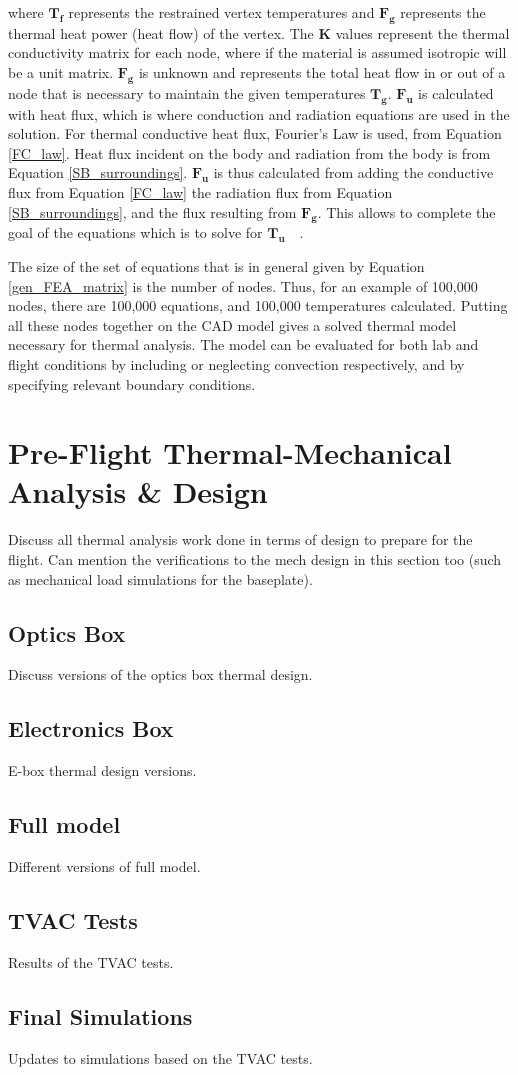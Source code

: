 where $\bm{T_f}$ represents the restrained vertex temperatures and $\bm{F_g}$ represents the thermal heat power (heat flow) of the vertex. The $\bm{K}$ values represent the thermal conductivity matrix for each node, where if the material is assumed isotropic will be a unit matrix. $\bm{F_g}$ is unknown and represents the total heat flow in or out of a node that is necessary to maintain the given temperatures $\bm{T_g}$. $\bm{F_u}$ is calculated with heat flux, which is where conduction and radiation equations are used in the solution. For thermal conductive heat flux, Fourier's Law is used, from Equation \ref{FC_law}. Heat flux incident on the body and radiation from the body is from Equation \ref{SB_surroundings}. $\bm{F_u}$ is thus calculated from adding the conductive flux from Equation \ref{FC_law} the radiation flux from Equation \ref{SB_surroundings}, and the flux resulting from $\bm{F_g}$. This allows to complete the goal of the equations which is to solve for $\bm{T_u}$~\cite{FEA_SW}~\cite{FEA_Procedures}.

The size of the set of equations that is in general given by Equation \ref{gen_FEA_matrix} is the number of nodes. Thus, for an example of 100,000 nodes, there are 100,000 equations, and 100,000 temperatures calculated. Putting all these nodes together on the CAD model gives a solved thermal model necessary for thermal analysis.  The model can be evaluated for both lab and flight conditions by including or neglecting convection respectively, and by specifying relevant boundary conditions. 

\section{Pre-Flight Thermal-Mechanical Analysis \& Design}
Discuss all thermal analysis work done in terms of design to prepare for the flight. Can mention the verifications to the mech design in this section too (such as mechanical load simulations for the baseplate).

\subsection{Optics Box}
Discuss versions of the optics box thermal design.

\subsection{Electronics Box}
E-box thermal design versions.

\subsection{Full model}
Different versions of full model.

\subsection{TVAC Tests}
Results of the TVAC tests.

\subsection{Final Simulations}
Updates to simulations based on the TVAC tests.